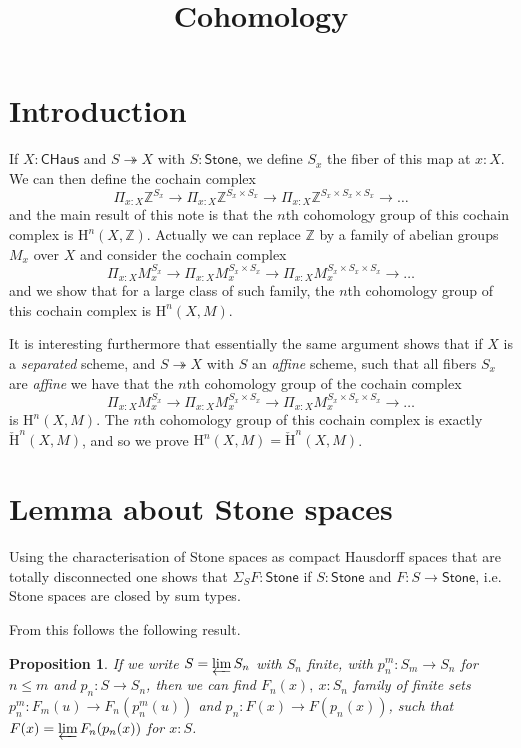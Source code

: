 \documentclass[10pt,a4paper]{article}
\newtheorem{proposition}{Proposition}[section]
\newcommand\HH{\mathrm{H}}
\newcommand\cHH{\check{\mathrm{H}}}
\newcommand{\ints}{\mathbb{Z}}
\newcommand{\Stone}{\mathsf{Stone}}
\newcommand{\CHaus}{\mathsf{CHaus}}
\newcommand{\ras}{\twoheadrightarrow}
\begin{document}
\title{Cohomology}

\author{}
\date{}
\maketitle


\section*{Introduction}

If $X:\CHaus$ and $S\ras X$ with $S:\Stone$, we define $S_x$ the fiber of this map at $x:X$. We can then define the cochain complex
\[
\Pi_{x:X}\ints^{S_x}\rightarrow \Pi_{x:X}\ints^{S_x\times S_x}\rightarrow \Pi_{x:X}\ints^{S_x\times S_x\times S_x}\rightarrow \dots
\]
and the main result of this note is that the $n$th cohomology group of this cochain complex is
$\HH^n(X,\ints)$. Actually we can replace $\ints$ by a family of abelian groups $M_x$ over $X$
and consider the cochain complex
\[
\Pi_{x:X}M_x^{S_x}\rightarrow \Pi_{x:X}M_x^{S_x\times S_x}\rightarrow \Pi_{x:X}M_x^{S_x\times S_x\times S_x}\rightarrow \dots
\]
and we show that for a large class of such family, the $n$th cohomology group of this cochain complex is
$\HH^n(X,M)$. 

\medskip

It is interesting furthermore that essentially the same argument shows that if $X$ is a {\em separated}
scheme, and $S\ras X$ with $S$ an {\em affine} scheme, such that all fibers $S_x$ are {\em affine}
we have that the $n$th cohomology group of the cochain complex
\[
\Pi_{x:X}M_x^{S_x}\rightarrow \Pi_{x:X}M_x^{S_x\times S_x}\rightarrow \Pi_{x:X}M_x^{S_x\times S_x\times S_x}\rightarrow \dots
\]
is $\HH^n(X,M)$. The $n$th cohomology group of this cochain complex is exactly $\cHH^n(X,M)$, and so we
prove $\HH^n(X,M) = \cHH^n(X,M)$.


\section{Lemma about Stone spaces}

Using the characterisation of Stone spaces as compact Hausdorff spaces that are totally disconnected one shows
that $\Sigma_SF:\Stone$ if $S:\Stone$ and $F:S\rightarrow\Stone$, i.e. Stone spaces are closed by sum types.

From this follows the following result.

\begin{proposition}
  If we write $S = \varprojlim S_n$ with $S_n$ finite, with $p_n^m : S_m\rightarrow S_n$ for $n\leqslant m$
  and $p_n:S\rightarrow S_n$, 
  then we can find $F_n(x),~x:S_n$ family of finite sets $p_n^m:F_m(u)\rightarrow F_n(p_n^m(u))$
  and $p_n:F(x)\rightarrow F(p_n(x))$,
  such that $F(x) = \varprojlim F_n(p_n(x))$ for $x:S$.
\end{proposition}
\end{document}
